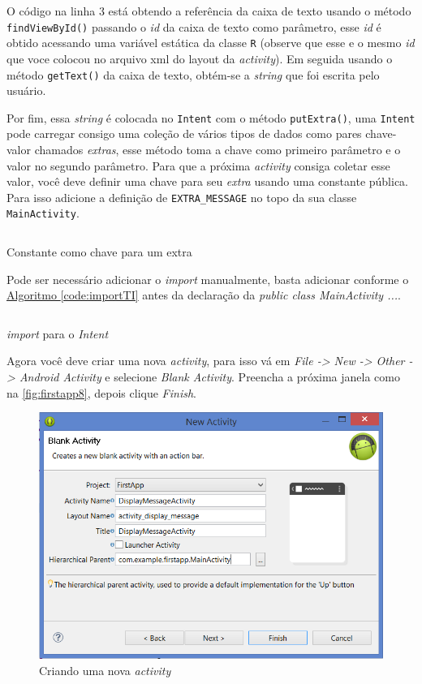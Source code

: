 \documentclass[a4paper,12pt,brazil,oneside]{book}
\begin{document}
O código na linha 3 está obtendo a referência da caixa de texto usando o método \\ \texttt{findViewById()} passando o \textit{id} da caixa de texto como parâmetro, esse \emph{id} é obtido acessando uma variável estática da classe \texttt{R}  (observe que esse e o mesmo \emph{id} que voce colocou no arquivo xml do layout da \emph{activity}).
Em seguida usando o método \texttt{getText()} da caixa de texto, obtém-se a \emph{string} que foi escrita pelo usuário.

Por fim, essa \emph{string} é colocada no \texttt{Intent} com o método \texttt{putExtra()}, uma \texttt{Intent} pode carregar consigo uma coleção de vários tipos de dados como pares chave-valor chamados \textit{extras}, esse método toma a chave como primeiro parâmetro e o valor no segundo parâmetro.
Para que a próxima \emph{activity} consiga coletar esse valor, você deve definir uma chave para seu \textit{extra} usando uma constante pública. Para isso adicione a definição de \texttt{EXTRA\_MESSAGE} no topo da sua classe \texttt{MainActivity}.

\begin{listing}[H]
\inputminted[linenos=true,fontsize=\small,frame=lines, framesep=2mm, tabsize=2,numbersep=5pt]{java}{src/firstapp/7.java}
\caption{Constante como chave para um extra}
\end{listing}

Pode ser necessário adicionar o \emph{import} manualmente, basta adicionar conforme o \hyperref[code:importTI]{Algoritmo \ref*{code:importTI}} antes da declaração da \emph{public class MainActivity ...}.

\begin{listing}[H]
\inputminted[linenos=true,fontsize=\small,frame=lines, framesep=2mm, tabsize=2,numbersep=5pt]{java}{src/firstapp/10.java}
\caption{\emph{import} para o \emph{Intent}}
\label{code:importTI}
\end{listing}

Agora você deve criar uma nova \emph{activity}, para isso vá em \textit{File -> New -> Other -> Android Activity} e selecione \textit{Blank Activity}. Preencha a próxima janela como na \autoref{fig:firstapp8}, depois clique \textit{Finish}. 

\begin{figure}[H]
  \centering
  \includegraphics[width=.75\textwidth]{figuras/firstapp/firstapp8.png}
  \caption{Criando uma nova \emph{activity}}
  \label{fig:firstapp8}
\end{figure}
\end{document}
